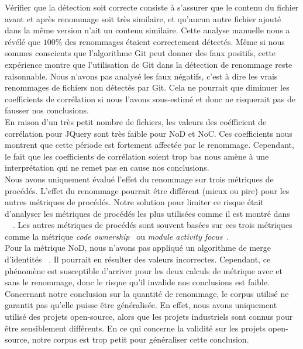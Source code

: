 Vérifier que la détection soit correcte consiste à s'assurer que le contenu du fichier avant et après renommage soit très similaire, et qu'aucun autre fichier ajouté dans la même version n'ait un contenu similaire. Cette analyse manuelle nous a révélé que  $100\%$ des renommages étaient correctement détectés. Même si nous sommes conscients que l'algorithme Git peut donner des faux positifs, cette expérience montre que l'utilisation de Git dans la détection de renommage reste raisonnable. Nous n'avons pas analysé les faux négatifs, c'est à dire les vrais renommages de fichiers non détectés par Git. Cela ne pourrait que diminuer les coefficients de corrélation si nous l'avons sous-estimé et donc ne risquerait pas de fausser nos conclusions. \\  

En raison d'un très petit nombre de fichiers, les valeurs des coéfficient de corrélation pour JQuery sont très faible pour NoD et NoC. Ces coefficients nous montrent que cette période est fortement affectée par le renommage. Cependant, le fait que les coefficients de corrélation soient trop bas nous amène à une interprétation qui ne remet pas en cause nos conclusions.\\

Nous avons uniquement évalué l'effet du renommage sur trois métriques de procédés. L'effet du renommage pourrait être différent (mieux ou pire) pour les autres métriques de procédés. Notre solution pour limiter ce risque était d'analyser les métriques de procédés les plus utilisées comme il est montré dans ~~\cite{radjenovic_software_2013}. Les autres métriques de procédés sont souvent basées sur ces trois métriques comme la métrique \emph{code ownership}~\cite{bird_dont_2011} ou \emph{module activity focus}~\cite{posnett_dual_2013}.\\

Pour la métrique NoD, nous n'avons pas appliqué un algorithme de merge d'identités ~\cite{goeminne_comparison_2013}. Il pourrait en résulter des valeurs incorrectes. Cependant, ce phénomène est susceptible d'arriver pour les deux calculs de métrique avec et sans le renommage, donc le risque qu'il invalide nos conclusions est faible.\\

Concernant notre conclusion sur la quantité de renommage, le corpus utilisé ne garantit pas qu'elle puisse être généralisée. En effet, nous avons uniquement utilisé des projets open-source, alors que les projets industriels sont connus pour être sensiblement différents. En ce qui concerne la validité sur les projets open-source, notre corpus est trop petit pour généraliser cette conclusion.\\
